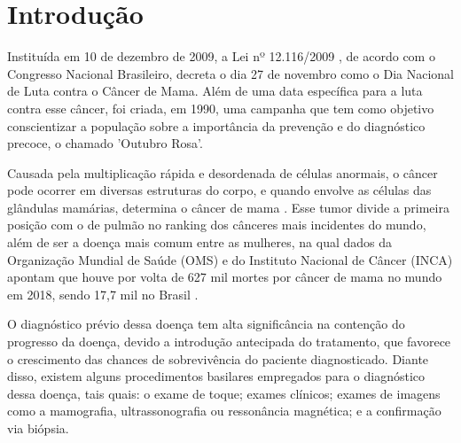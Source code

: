 \section{\esp Introdução}

Instituída em 10 de dezembro de 2009, a Lei nº 12.116/2009 , de acordo com o Congresso Nacional Brasileiro, decreta o dia 27 de novembro como o Dia Nacional de Luta contra o Câncer de Mama. Além de uma data específica para a luta contra esse câncer, foi criada, em 1990, uma campanha que tem como objetivo conscientizar a população sobre a importância da prevenção e do diagnóstico precoce, o chamado 'Outubro Rosa'.

Causada pela multiplicação rápida e desordenada de células anormais, o câncer pode ocorrer em diversas estruturas do corpo, e quando envolve as células das glândulas mamárias, determina o câncer de mama \cite{incaoquee}. Esse tumor divide a primeira posição com o de pulmão no ranking dos cânceres mais incidentes do mundo, além de ser a doença mais comum entre as mulheres, na qual dados da Organização Mundial de Saúde (OMS) e do Instituto Nacional de Câncer (INCA) apontam que houve por volta de 627 mil mortes por câncer de mama no mundo em 2018, sendo 17,7 mil no Brasil \cite{boletimepidemiologico}.

O diagnóstico prévio dessa doença tem alta significância na contenção do progresso da doença, devido a introdução antecipada do tratamento, que favorece o crescimento das chances de sobrevivência do paciente diagnosticado. Diante disso, existem alguns procedimentos basilares empregados para o diagnóstico dessa doença, tais quais: o exame de toque; exames clínicos; exames de imagens como a mamografia, ultrassonografia ou ressonância magnética; e a confirmação via biópsia.

